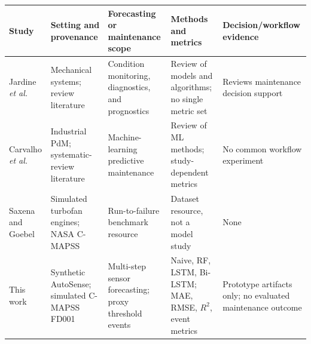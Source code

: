 \begin{tabular}{>{\raggedright\arraybackslash}p{1.65cm}>{\raggedright\arraybackslash}p{2.7cm}>{\raggedright\arraybackslash}p{2.7cm}>{\raggedright\arraybackslash}p{3.65cm}>{\raggedright\arraybackslash}p{3.55cm}}
\toprule
Study & Setting and provenance & Forecasting or maintenance scope & Methods and metrics & Decision/workflow evidence \\
\midrule
Jardine \emph{et al.}~\cite{jardine2006} & Mechanical systems; review literature & Condition monitoring, diagnostics, and prognostics & Review of models and algorithms; no single metric set & Reviews maintenance decision support \\
Carvalho \emph{et al.}~\cite{carvalho2019} & Industrial PdM; systematic-review literature & Machine-learning predictive maintenance & Review of ML methods; study-dependent metrics & No common workflow experiment \\
Saxena and Goebel~\cite{saxena2008} & Simulated turbofan engines; NASA C-MAPSS & Run-to-failure benchmark resource & Dataset resource, not a model study & None \\
This work & Synthetic AutoSense; simulated C-MAPSS FD001 & Multi-step sensor forecasting; proxy threshold events & Naive, RF, LSTM, Bi-LSTM; MAE, RMSE, $R^2$, event metrics & Prototype artifacts only; no evaluated maintenance outcome \\
\bottomrule
\end{tabular}
